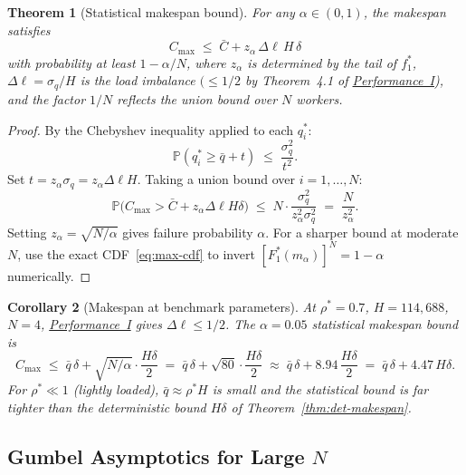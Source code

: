 \documentclass[11pt,a4paper]{report}
\newtheorem{theorem}{Theorem}[section]
\newtheorem{corollary}[theorem]{Corollary}
\newcommand{\rhostar}{\rho^{*}}
\newcommand{\qbar}{\bar{q}}
\newcommand{\Dl}{\Delta\ell}
\newcommand{\Cmax}{C_{\max}}
\newcommand{\Cbar}{\bar{C}}
\newcommand{\sigmaq}{\sigma_q}
\begin{document}
\begin{theorem}[Statistical makespan bound]
\label{thm:stat-makespan}
For any $\alpha \in (0,1)$, the makespan satisfies
\begin{equation}
  \Cmax \;\leq\; \Cbar + z_\alpha\,\Dl\,H\,\delta
  \label{eq:stat-bound}
\end{equation}
with probability at least $1 - \alpha/N$,
where $z_\alpha$ is determined by the tail of $f_1^*$,
$\Dl = \sigmaq/H$ is the load imbalance
$(\leq 1/2$ by Theorem~4.1 of \hyperref[chap:load_balance]{Performance~I}),
and the factor $1/N$ reflects the union bound over $N$ workers.
\end{theorem}

\begin{proof}
By the Chebyshev inequality applied to each $q_i^*$:
\[
  \mathbb{P}(q_i^* \geq \qbar + t) \;\leq\; \frac{\sigmaq^2}{t^2}.
\]
Set $t = z_\alpha \sigmaq = z_\alpha \Dl H$.
Taking a union bound over $i = 1,\ldots, N$:
\[
  \mathbb{P}\!\bigl(\Cmax > \Cbar + z_\alpha \Dl H \delta\bigr)
  \;\leq\;
  N \cdot \frac{\sigmaq^2}{z_\alpha^2 \sigmaq^2}
  \;=\; \frac{N}{z_\alpha^2}.
\]
Setting $z_\alpha = \sqrt{N/\alpha}$ gives failure probability $\alpha$.
For a sharper bound at moderate $N$, use the exact CDF~\eqref{eq:max-cdf}
to invert $[F_1^*(m_\alpha)]^N = 1-\alpha$ numerically.
\end{proof}

\begin{corollary}[Makespan at benchmark parameters]
\label{cor:stat-benchmark}
\label{sec:stat-makespan-correction}
At $\rhostar = 0.7$, $H = 114{,}688$, $N = 4$,
\hyperref[chap:load_balance]{Performance~I} gives $\Dl \leq 1/2$.
The $\alpha = 0.05$ statistical makespan bound is
\[
  \Cmax \;\leq\; \qbar\,\delta + \sqrt{N/\alpha}\cdot\frac{H\delta}{2}
  \;=\; \qbar\,\delta + \sqrt{80}\cdot\frac{H\delta}{2}
  \;\approx\; \qbar\,\delta + 8.94\,\frac{H\delta}{2}
  \;=\; \qbar\,\delta + 4.47\,H\delta.
\]
For $\rhostar \ll 1$ (lightly loaded), $\qbar \approx \rhostar H$ is small
and the statistical bound is far tighter than the deterministic
bound $H\delta$ of Theorem~\ref{thm:det-makespan}.
\end{corollary}

\subsection{Gumbel Asymptotics for Large $N$}\label{sec:gumbel}
\end{document}
